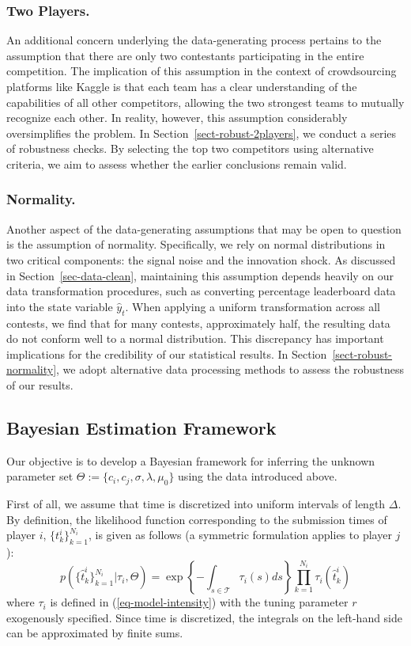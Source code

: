 \documentclass[mnsc]{informs3}
\begin{document}
\subsubsection{Two Players.}

An additional concern underlying the data-generating process pertains to the assumption that there are only two contestants participating in the entire competition.
The implication of this assumption in the context of crowdsourcing platforms like Kaggle is that each team has a clear understanding of the capabilities of all other competitors, allowing the two strongest teams to mutually recognize each other. 
In reality, however, this assumption considerably oversimplifies the problem.
In Section~\ref{sect-robust-2players}, we conduct a series of robustness checks. 
By selecting the top two competitors using alternative criteria, we aim to assess whether the earlier conclusions remain valid.

\subsubsection{Normality.}

Another aspect of the data-generating assumptions that may be open to question is the assumption of normality. 
Specifically, we rely on normal distributions in two critical components: the signal noise and the innovation shock. 
As discussed in Section~\ref{sec-data-clean}, maintaining this assumption depends heavily on our data transformation procedures, such as converting percentage leaderboard data into the state variable $\hat{y}_t$. 
When applying a uniform transformation across all contests, we find that for many contests, approximately half, the resulting data do not conform well to a normal distribution. 
This discrepancy has important implications for the credibility of our statistical results.
In Section~\ref{sect-robust-normality}, we adopt alternative data processing methods to assess the robustness of our results.



\subsection{Bayesian Estimation Framework}

Our objective is to develop a Bayesian framework for inferring the unknown parameter set $\Theta := \{ c_i, c_j, \sigma, \lambda, \mu_0 \}$ using the data introduced above.

First of all, we assume that time is discretized into uniform intervals of length $\Delta$.
By definition, the likelihood function corresponding to the submission times of player $i$, $\{t^i_k\}_{k=1}^{N_i}$, is given as follows (a symmetric formulation applies to player $j$):
\begin{equation}\label{eq-ihpp-prob}
p\left(\{\hat{t}^i_k\}_{k=1}^{N_i} | \tau_i, \Theta\right) = \exp\left\{-\int_{s\in\mathcal{T}}\tau_i(s)ds\right\}\prod_{k=1}^{N_i}\tau_i(\hat{t}^i_k)
\end{equation}
where $\tau_i$ is defined in (\ref{eq-model-intensity}) with the tuning parameter $r$ exogenously specified. 
Since time is discretized, the integrals on the left-hand side can be approximated by finite sums.
\end{document}
